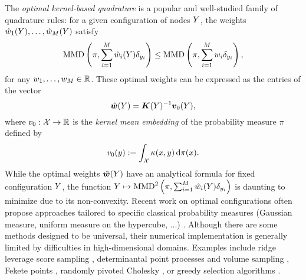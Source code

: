 The \textit{optimal kernel-based quadrature} is a popular and well-studied family of quadrature rules: for a given configuration of nodes $Y$, the weights $\hat{w}_{1}(Y),\ldots,\hat{w}_{M}(Y)$ satisfy 
\begin{equation}\label{eq:MMD_optimality_okq}
     \mathrm{MMD} \left( \pi, \sum\limits_{i=1}^M \hat{w}_{i}(Y) \delta_{y_{i}}  \right) \leq \mathrm{MMD} \left( \pi, \sum\limits_{i=1}^M w_{i} \delta_{y_{i}} \right),
\end{equation}
for any $w_{1}, \dots, w_{M} \in \mathbb{R}$. These optimal weights can be expressed as the entries of the vector 
\begin{equation}\label{eq:optimal_w}
    \hat{\bm{w}}(Y) = \bm{K}(Y)^{-1} \bm{v}_{0}(Y),
\end{equation}
where $v_{0}: \mathcal{X} \rightarrow \mathbb{R}$ is the \emph{kernel mean embedding} of the probability measure $\pi$ defined by 
\begin{equation}\label{eq:mke_def}
    v_{0}(y):= \int_{\mathcal{X}} \kappa(x,y) \,\mathrm{d}\pi(x).
\end{equation}
While the optimal weights $\hat{\bm{w}}(Y)$ have an analytical formula for fixed configuration $Y$, the function $Y \mapsto \operatorname{MMD}^2\left(\pi, \sum_{i =1}^M \hat{w}_{i}(Y) \delta_{y_{i}} \right)$
is daunting to minimize due to its non-convexity.
Recent work on optimal configurations often propose approaches tailored to specific classical probability measures (Gaussian measure, uniform measure on the hypercube, ...) \cite{KaSa18,KaSa19,EhGrOa19}. %
Although there are some methods designed to be universal, their numerical implementation is generally limited by difficulties in high-dimensional domains. Examples include ridge leverage score sampling \cite{Bac17}, determinantal point processes and volume sampling \cite{BeBaCh19, BeBaCh20,Bel21}, Fekete points \cite{KaSaTa21}, randomly pivoted Cholesky \cite{EpMo23}, or greedy selection algorithms \cite{De03,DeScWe05,SaHa16,Oet17,HuDu12,BrOaGiOs15,LaLiBa15}.

